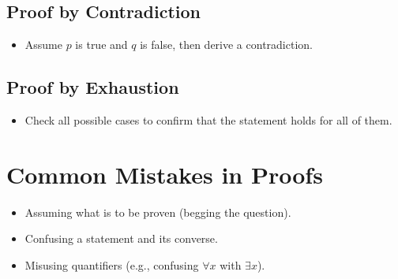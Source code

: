 \documentclass{article}
\begin{document}
\subsection{Proof by Contradiction}
\begin{itemize}
    \item Assume $p$ is true and $q$ is false, then derive a contradiction.
\end{itemize}

\subsection{Proof by Exhaustion}
\begin{itemize}
    \item Check all possible cases to confirm that the statement holds for all of them.
\end{itemize}

\section{Common Mistakes in Proofs}

\begin{itemize}
    \item Assuming what is to be proven (begging the question).
    \item Confusing a statement and its converse.
    \item Misusing quantifiers (e.g., confusing $\forall x$ with $\exists x$).
\end{itemize}






\end{document}
